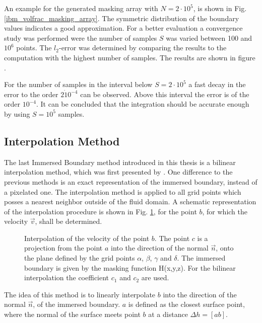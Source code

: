 An example for the generated masking array with $N=2\cdot10^{5}$, is shown in Fig. \ref{ibm_volfrac_masking_array}.
The symmetric distribution of the boundary values indicates
a good approximation. For a better evaluation a convergence study was performed were the number of samples $S$ was varied between 100 and $10^6$ points.
The $l_2$-error was determined by comparing the results to the computation with the highest number of samples.
The results are shown in figure \label{ibm_volfrac_montecarlo}.

For the number of samples in the interval below $S=2\cdot10^5$  a fast decay in the error to the order $2\dot10^{-4}$ can be observed.
Above this interval the error is of the order $10^{-4}$.
It can be concluded that the integration should be accurate enough by using $S=10^5$ samples.

\clearpage
\subsection{Interpolation Method}

The last Immersed Boundary method introduced in this thesis is a bilinear interpolation method, which was first presented by \citep{Gilmanov2003}.
One difference to the previous methods is an exact representation of the immersed boundary, instead of a pixelated one.
The interpolation method is applied to all grid points which posses a nearest neighbor outside of the fluid domain.
A schematic representation of the interpolation procedure is shown in Fig. \ref{ibm:ip_method_algo},
for the point $b$, for which the velocity $\vec{v}$, shall be determined.

\begin{figure}[!bp]
      \centering
      \caption{Interpolation of the velocity of the point $b$. The point $c$ is a projection from the point $a$ into the direction of the normal $\vec{n}$,
       onto the plane defined by the grid points $\alpha$, $\beta$, $\gamma$ and $\delta$. The immersed boundary is given by the masking function H(x,y,z).
       For the bilinear interpolation the coefficient $c_1$ and $c_2$ are used.
      }
    \label{ibm:ip_method_algo}
\end{figure}

The idea of this method is to linearly interpolate $b$ into the direction of the normal $\vec{n}$, of the immersed boundary.
$a$ is defined as the closest surface point, where the normal of the surface meets point $b$ at a distance $\Delta h =[ab]$.

